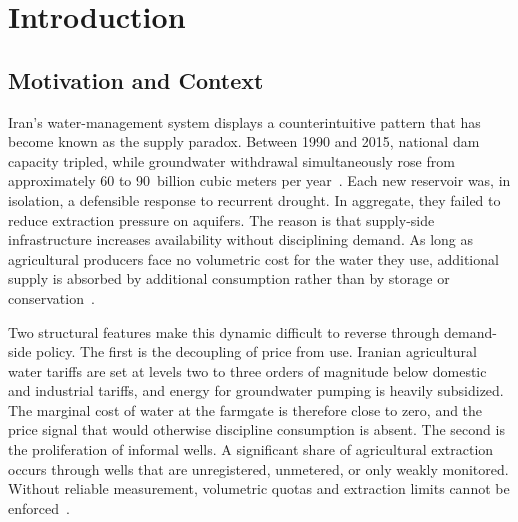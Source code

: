 %

\chapter{Introduction}
\label{chap:intro}

\section{Motivation and Context}
\label{sec:intro-motivation}

Iran's water-management system displays a counterintuitive pattern that
has become known as the supply paradox. Between 1990 and 2015, national
dam capacity tripled, while groundwater withdrawal simultaneously rose
from approximately 60 to 90~billion cubic meters per
year~\cite{Mesgaran2018,Behling2022}. Each new reservoir was, in
isolation, a defensible response to recurrent drought. In aggregate,
they failed to reduce extraction pressure on aquifers. The reason is
that supply-side infrastructure increases availability without
disciplining demand. As long as agricultural producers face no
volumetric cost for the water they use, additional supply is absorbed
by additional consumption rather than by storage or
conservation~\cite{Mesgaran2018,Nouri2023}.

Two structural features make this dynamic difficult to reverse through
demand-side policy. The first is the decoupling of price from use.
Iranian agricultural water tariffs are set at levels two to three
orders of magnitude below domestic and industrial tariffs, and energy
for groundwater pumping is heavily subsidized. The marginal cost of
water at the farmgate is therefore close to zero, and the price signal
that would otherwise discipline consumption is absent. The second is
the proliferation of informal wells. A significant share of
agricultural extraction occurs through wells that are unregistered,
unmetered, or only weakly monitored. Without reliable measurement,
volumetric quotas and extraction limits cannot be
enforced~\cite{Mesgaran2018,PourgholamAmiji2024}.

